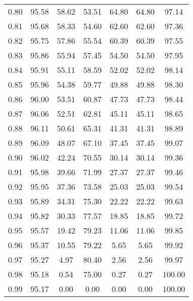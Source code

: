 \begin{tabular}{|c|c|c|c|c|c|c|}
      0.80 &     95.58 &     58.62 &      53.51 &   64.80 &      64.80 &         97.14 \\
      0.81 &     95.68 &     58.33 &      54.60 &   62.60 &      62.60 &         97.36 \\
      0.82 &     95.75 &     57.86 &      55.54 &   60.39 &      60.39 &         97.55 \\
      0.83 &     95.86 &     55.94 &      57.45 &   54.50 &      54.50 &         97.95 \\
      0.84 &     95.91 &     55.11 &      58.59 &   52.02 &      52.02 &         98.14 \\
      0.85 &     95.96 &     54.38 &      59.77 &   49.88 &      49.88 &         98.30 \\
      0.86 &     96.00 &     53.51 &      60.87 &   47.73 &      47.73 &         98.44 \\
      0.87 &     96.06 &     52.51 &      62.81 &   45.11 &      45.11 &         98.65 \\
      0.88 &     96.11 &     50.61 &      65.31 &   41.31 &      41.31 &         98.89 \\
      0.89 &     96.09 &     48.07 &      67.10 &   37.45 &      37.45 &         99.07 \\
      0.90 &     96.02 &     42.24 &      70.55 &   30.14 &      30.14 &         99.36 \\
      0.91 &     95.98 &     39.66 &      71.99 &   27.37 &      27.37 &         99.46 \\
      0.92 &     95.95 &     37.36 &      73.58 &   25.03 &      25.03 &         99.54 \\
      0.93 &     95.89 &     34.31 &      75.30 &   22.22 &      22.22 &         99.63 \\
      0.94 &     95.82 &     30.33 &      77.57 &   18.85 &      18.85 &         99.72 \\
      0.95 &     95.57 &     19.42 &      79.23 &   11.06 &      11.06 &         99.85 \\
      0.96 &     95.37 &     10.55 &      79.22 &    5.65 &       5.65 &         99.92 \\
      0.97 &     95.27 &      4.97 &      80.40 &    2.56 &       2.56 &         99.97 \\
      0.98 &     95.18 &      0.54 &      75.00 &    0.27 &       0.27 &        100.00 \\
      0.99 &     95.17 &      0.00 &       0.00 &    0.00 &       0.00 &        100.00 \\
\bottomrule
\end{tabular}
